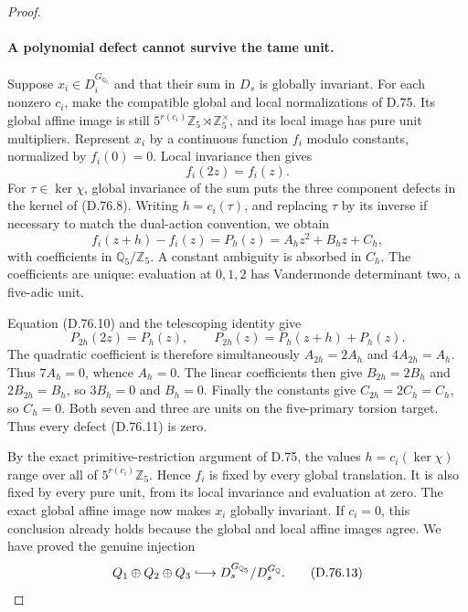 \begin{proof}
\paragraph{A polynomial defect cannot survive the tame unit.}
Suppose \(x_i\in D_i^{G_{\mathbb Q_5}}\) and that their
sum in \(D_s\) is globally invariant.
For each nonzero \(c_i\), make the compatible global and
local normalizations of D.75. Its global affine image is
still \(5^{r(c_i)}\mathbb Z_5\rtimes\mathbb Z_5^\times\),
and its local image has pure unit multipliers.
Represent \(x_i\) by a continuous function \(f_i\) modulo
constants, normalized by \(f_i(0)=0\).
Local invariance then gives
\[
                           f_i(2z)=f_i(z).             \tag{D.76.10}
\]
For \(\tau\in\ker\chi\), global invariance of the sum
puts the three component defects in the kernel of (D.76.8).
Writing \(h=c_i(\tau)\), and replacing \(\tau\) by its
inverse if necessary to match the dual-action convention,
we obtain
\[
 f_i(z+h)-f_i(z)=P_h(z)
                       =A_hz^2+B_hz+C_h,               \tag{D.76.11}
\]
with coefficients in \(\mathbb Q_5/\mathbb Z_5\).
A constant ambiguity is absorbed in \(C_h\).
The coefficients are unique: evaluation at \(0,1,2\)
has Vandermonde determinant two, a five-adic unit.

Equation (D.76.10) and the telescoping identity give
\[
              P_{2h}(2z)=P_h(z),\qquad
              P_{2h}(z)=P_h(z+h)+P_h(z).                \tag{D.76.12}
\]
The quadratic coefficient is therefore simultaneously
\(A_{2h}=2A_h\) and \(4A_{2h}=A_h\).
Thus \(7A_h=0\), whence \(A_h=0\).
The linear coefficients then give \(B_{2h}=2B_h\) and
\(2B_{2h}=B_h\), so \(3B_h=0\) and \(B_h=0\).
Finally the constants give \(C_{2h}=2C_h=C_h\),
so \(C_h=0\). Both seven and three are units on the
five-primary torsion target. Thus every defect (D.76.11)
is zero.

By the exact primitive-restriction argument of D.75,
the values \(h=c_i(\ker\chi)\) range over all of
\(5^{r(c_i)}\mathbb Z_5\). Hence \(f_i\) is fixed by
every global translation. It is also fixed by every pure
unit, from its local invariance and evaluation at zero.
The exact global affine image now makes \(x_i\) globally
invariant. If \(c_i=0\), this conclusion already holds
because the global and local affine images agree.
We have proved the genuine injection
\[
               Q_1\oplus Q_2\oplus Q_3
                  \lhook\joinrel\longrightarrow
                 D_s^{G_{\mathbb Q_5}}/D_s^{G_{\mathbb Q}}.
                                                               \tag{D.76.13}
\]


\end{proof}
